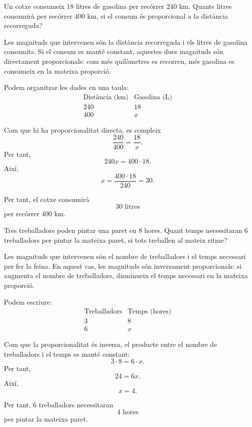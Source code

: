 \begin{exemple}
Un cotxe consumeix \(18\) litres de gasolina per recórrer \(240\) km. Quants litres consumirà per recórrer \(400\) km, si el consum és proporcional a la distància recorreguda?
\end{exemple}

\begin{solucio}
Les magnituds que intervenen són la distància recorreguda i els litres de gasolina consumits. Si el consum es manté constant, aquestes dues magnituds són directament proporcionals: com més quilòmetres es recorren, més gasolina es consumeix en la mateixa proporció.

Podem organitzar les dades en una taula:
\[
\begin{array}{c|c}
\text{Distància (km)} & \text{Gasolina (L)}\\
\hline
240 & 18\\
400 & x
\end{array}
\]

Com que hi ha proporcionalitat directa, es compleix
\[
	\frac{240}{400}=\frac{18}{x}.
\]
Per tant,
\[
	240x=400\cdot 18.
\]
Així,
\[
	x=\frac{400\cdot 18}{240}=30.
\]

Per tant, el cotxe consumirà
\[
	30\text{ litres}
\]
per recórrer \(400\) km.
\end{solucio}

\begin{exemple}
Tres treballadors poden pintar una paret en \(8\) hores. Quant temps necessitaran \(6\) treballadors per pintar la mateixa paret, si tots treballen al mateix ritme?
\end{exemple}

\begin{solucio}
Les magnituds que intervenen són el nombre de treballadors i el temps necessari per fer la feina. En aquest cas, les magnituds són inversament proporcionals: si augmenta el nombre de treballadors, disminueix el temps necessari en la mateixa proporció.

Podem escriure:
\[
\begin{array}{c|c}
\text{Treballadors} & \text{Temps (hores)}\\
\hline
3 & 8\\
6 & x
\end{array}
\]

Com que la proporcionalitat és inversa, el producte entre el nombre de treballadors i el temps es manté constant:
\[
	3\cdot 8=6\cdot x.
\]
Per tant,
\[
	24=6x.
\]
Així,
\[
	x=4.
\]

Per tant, \(6\) treballadors necessitaran
\[
	4\text{ hores}
\]
per pintar la mateixa paret.
\end{solucio}

